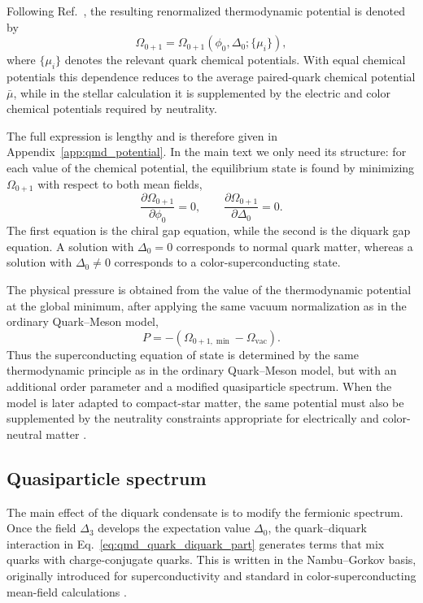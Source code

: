 Following Ref.~\cite{Andersen2024}, the resulting renormalized
thermodynamic potential is denoted by
\begin{equation}
\Omega_{0+1}
=
\Omega_{0+1}(\phi_0,\Delta_0;\{\mu_i\}),
\end{equation}
where \(\{\mu_i\}\) denotes the relevant quark chemical potentials. With
equal chemical potentials this dependence reduces to the
average paired-quark chemical potential \(\bar{\mu}\), while in the
stellar calculation it is supplemented by the electric and color
chemical potentials required by neutrality.

The full expression is lengthy and is therefore given in
Appendix~\ref{app:qmd_potential}. In the main text we only need its
structure: for each value of the chemical potential, the equilibrium state
is found by minimizing \(\Omega_{0+1}\) with respect to both mean fields,
\begin{equation}
\frac{\partial\Omega_{0+1}}{\partial\phi_0}=0,
\qquad
\frac{\partial\Omega_{0+1}}{\partial\Delta_0}=0 .
\label{eq:qmd_gap_equations}
\end{equation}
The first equation is the chiral gap equation, while the second is the
diquark gap equation. A solution with \(\Delta_0=0\) corresponds to
normal quark matter, whereas a solution with \(\Delta_0\neq0\)
corresponds to a color-superconducting state.

The physical pressure is obtained from the value of the thermodynamic
potential at the global minimum, after applying the same vacuum
normalization as in the ordinary Quark--Meson model,
\begin{equation}
P=-\left(\Omega_{0+1,\min}-\Omega_{\mathrm{vac}}\right).
\end{equation}
Thus the superconducting equation of state is determined by the same
thermodynamic principle as in the ordinary Quark--Meson model, but with an
additional order parameter and a modified quasiparticle spectrum. When the
model is later adapted to compact-star matter, the same potential must also
be supplemented by the neutrality constraints appropriate for electrically
and color-neutral matter \cite{Andersen2025}.

\subsection*{Quasiparticle spectrum}

The main effect of the diquark condensate is to modify the fermionic
spectrum. Once the field \(\Delta_3\) develops the expectation value
\(\Delta_0\), the quark--diquark interaction in
Eq.~\eqref{eq:qmd_quark_diquark_part} generates terms that mix quarks with
charge-conjugate quarks. This is written in the Nambu--Gorkov basis,
originally introduced for superconductivity \cite{Gorkov1958,Nambu1960}
and standard in color-superconducting mean-field calculations
\cite{Shovkovy2005,Andersen2024}.

